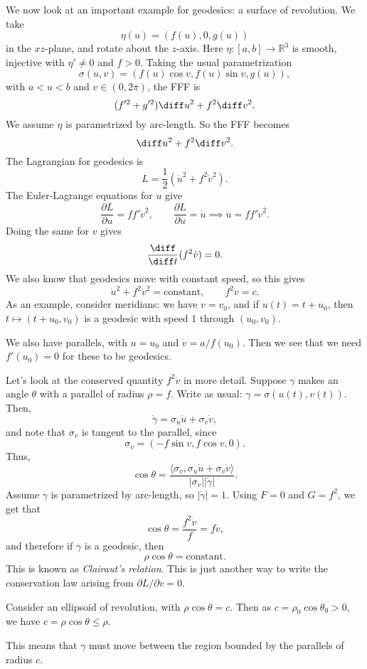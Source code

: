\documentclass[12pt]{article}
\begin{document}

We now look at an important example for geodesics: a surface of revolution. We take
\[
\eta(u) = (f(u), 0, g(u))
\]
in the $xz$-plane, and rotate about the $z$-axis. Here $\eta : [a, b] \to \mathbb{R}^3$ is smooth, injective with $\eta' \neq 0$ and $f > 0$. Taking the usual parametrization
\[
\sigma(u, v) = (f(u) \cos v, f(u) \sin v, g(u)),
\]
with $a < u < b$ and $v \in (0, 2\pi)$, the FFF is
\[
	(f'^2 + g'^2)\diff u^2 + f^2 \diff v^2.
\]
We assume $\eta$ is parametrized by arc-length. So the FFF becomes
\[
\diff u^2 + f^2 \diff v^2.
\]
The Lagrangian for geodesics is
\[
L = \frac{1}{2} (\dot u^2 + f^2 \dot v^2).
\]
The Euler-Lagrange equations for $u$ give
\[
\frac{\partial L}{\partial u} = f f' \dot v^2, \qquad \frac{\partial L}{\partial \dot u} = \dot u \implies \ddot u = f f' \dot v^2.
\]
Doing the same for $v$ gives
\[
\frac{\diff}{\diff t}(f^2 \dot v) = 0.
\]
We also know that geodesics move with constant speed, so this gives
\[
	\dot u^2 + f^2 \dot v^2 = \text{constant}, \qquad f^2 \dot v = c.
\]
As an example, consider meridians: we have $v = v_0$, and if $u(t) = t + u_0$, then $t \mapsto (t + u_0, v_0)$ is a geodesic with speed 1 through $(u_0, v_0)$.

We also have parallels, with $u = u_0$ and $\dot v = a/f(u_0)$. Then we see that we need $f'(u_0) = 0$ for these to be geodesics.

Let's look at the conserved quantity $f^2 \dot v$ in more detail. Suppose $\gamma$ makes an angle $\theta$ with a parallel of radius $\rho = f$. Write as usual: $\gamma = \sigma(u(t), v(t))$. Then,
\[
\dot \gamma = \sigma_u \dot u + \sigma_v \dot v,
\]
and note that $\sigma_v$ is tangent to the parallel, since
\[
\sigma_v = (-f \sin v, f \cos v, 0).
\]
Thus,
\[
\cos \theta = \frac{\langle \sigma_v, \sigma_u \dot u + \sigma_v \dot v \rangle}{|\sigma_v||\dot \gamma|}.
\]
Assume $\gamma$ is parametrized by arc-length, so $|\dot \gamma| = 1$. Using $F = 0$ and $G = f^2$, we get that
\[
\cos \theta = \frac{f^2 \dot v}{f} = f \dot v,
\]
and therefore if $\gamma$ is a geodesic, then
\[
	\rho \cos \theta = \text{constant}.
\]
This is known as \emph{Clairaut's relation}. This is just another way to write the conservation law arising from $\partial L/\partial v = 0$.

\begin{exbox}
	Consider an ellipsoid of revolution, with $\rho \cos \theta = c$. Then as $c = \rho_0 \cos \theta_0 > 0$, we have $c = \rho \cos \theta \leq \rho$.

	This means that $\gamma$ must move between the region bounded by the parallels of radius $c$.%
\end{exbox}
\end{document}
